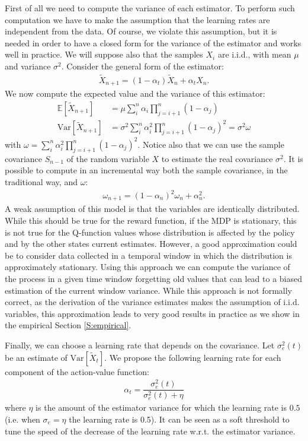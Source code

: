 \documentclass[conference]{IEEEtran}
\begin{document}
First of all we need to compute the variance of each estimator. To perform such computation we have to make the assumption that the learning rates are independent from the data. Of course, we violate this assumption, but it is needed in order to have a closed form for the variance of the estimator and works well in practice. We will suppose also that the samples $X_i$ are i.i.d., with mean $\mu$ and variance $\sigma^2$. Consider the general form of the estimator:
\begin{align}
 \widetilde{X}_{n+1} = (1-\alpha_t)\widetilde{X}_{n}+\alpha_tX_{n}.
\end{align}
We now compute the expected value and the variance of this estimator:
\begin{align}
 \mathbb{E}\left[\widetilde{X}_{n+1}\right]& = \mu\sum_i^n \alpha_i \prod_{j=i+1}^{n} \left(1-\alpha_j\right)\\
 \mathrm{Var}\left[\widetilde{X}_{n+1}\right]& = \sigma^2\sum_i^n \alpha_i^2 \prod_{j=i+1}^{n} \left(1-\alpha_j\right)^2 = \sigma^2\omega
\end{align}
with $\omega=\sum_i^n \alpha_i^2 \prod_{j=i+1}^{n} \left(1-\alpha_j\right)^2$. Notice also that we can use the sample covariance $S_{n-1}$ of the random variable $X$ to estimate the real covariance $\sigma^2$. It is possible to compute in an incremental way both the sample covariance, in the traditional way, and $\omega$:
\begin{align}
 \omega_{n+1}=(1-\alpha_n)^2\omega_n+\alpha_n^2.
\end{align}
A weak assumption of this model is that the variables are identically distributed. While this should be true for the reward function, if the MDP is stationary, this is not true for the Q-function values whose distribution is affected by the policy and by the other states current estimates. However, a good approximation could be to consider data collected in a temporal window in which the distribution is approximately stationary. Using this approach we can compute the variance of the process in a given time window forgetting old values that can lead to a biased estimation of the current window variance. While this approach is not formally correct, as the derivation of the variance estimates makes the assumption of i.i.d. variables, this approximation leads to very good results in practice as we show in the empirical Section \ref{S:empirical}.

Finally, we can choose a learning rate that depends on the covariance. Let $\sigma_e^2(t)$ be an estimate of $\mathrm{Var}\left[\widetilde{X}_{t}\right]$. We propose the following learning rate for each component of the action-value function:
\begin{align}\label{eq:alpha_eq}
 \alpha_t=\dfrac{\sigma_e^2(t)}{\sigma_e^2(t)+\eta}
\end{align}
where $\eta$ is the amount of the estimator variance for which the learning rate is $0.5$ (i.e. when $\sigma_e=\eta$ the learning rate is 0.5). It can be seen as a soft threshold to tune the speed of the decrease of the learning rate w.r.t. the estimator variance.
\end{document}
